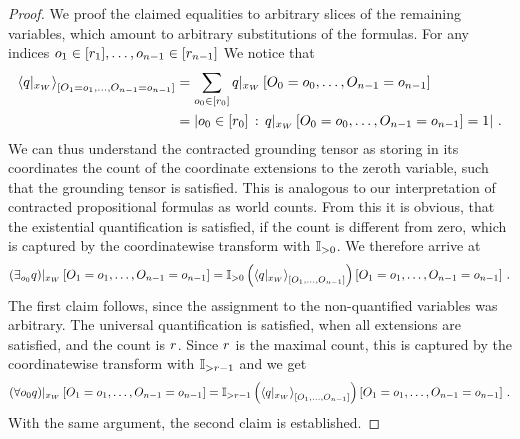 \begin{proof}
    We proof the claimed equalities to arbitrary slices of the remaining variables, which amount to arbitrary substitutions of the formulas.
    For any indices $o_{1}\in[r_{1}],\ldots,o_{n-1}\in[r_{n-1}]$ We notice that
    \begin{align*}
        \left\langle {q}|_{x_{W}}\right\rangle_{\left[ O_{1}=o_{1},\ldots,O_{n-1}=o_{n-1} \right]}
        &= \sum_{o_{0}\in[r_{0}]} {q}|_{x_{W}} \left[O_{0}=o_{0},\ldots,O_{n-1}=o_{n-1}\right] \\
        &= \left|o_{0}\in[r_{0}] \,:\, {q}|_{x_{W}} \left[O_{0}=o_{0},\ldots,O_{n-1}=o_{n-1}\right]=1\right| \, .
    \end{align*}
    We can thus understand the contracted grounding tensor as storing in its coordinates the count of the coordinate extensions to the zeroth variable, such that the grounding tensor is satisfied.
    This is analogous to our interpretation of contracted propositional formulas as world counts.
    From this it is obvious, that the existential quantification is satisfied, if the count is different from zero, which is captured by the coordinatewise transform with $\mathbb{I}_{>0}$.
    We therefore arrive at
    \begin{align*}
        {\left(\exists_{o_{0}}q\right)}|_{x_{W}} \left[O_{1}=o_{1},\ldots,O_{n-1}=o_{n-1}\right] =
        {\mathbb{I}_{>0}}\left(\left\langle {q}|_{x_{W}}\right\rangle_{\left[ O_{1},\ldots,O_{n-1} \right]}\right)\left[O_{1}=o_{1},\ldots,O_{n-1}=o_{n-1}\right] \, .
    \end{align*}
    The first claim follows, since the assignment to the non-quantified variables was arbitrary.
    The universal quantification is satisfied, when all extensions are satisfied, and the count is $r$.
    Since $r$ is the maximal count, this is captured by the coordinatewise transform with $\mathbb{I}_{>r-1}$ and we get
    \begin{align*}
        {\left(\forall{o_{0}}q\right)}|_{x_{W}} \left[O_{1}=o_{1},\ldots,O_{n-1}=o_{n-1}\right] =
        {\mathbb{I}_{>r-1}}\left(\left\langle {q}|_{x_{W}}\right\rangle_{\left[ O_{1},\ldots,O_{n-1} \right]}\right)\left[O_{1}=o_{1},\ldots,O_{n-1}=o_{n-1}\right] \, .
    \end{align*}
    With the same argument, the second claim is established.
\end{proof}



